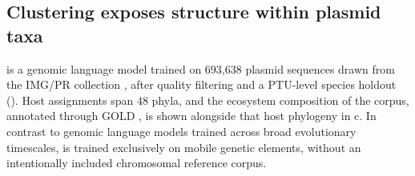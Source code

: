 %
%
%
%

\subsection*{Clustering exposes structure within plasmid taxa}
\label{sec:imgpr}

\model is a genomic language model trained on 693,638 plasmid sequences drawn
from the IMG/PR collection \cite{camargo2024img}, after quality filtering and
a PTU-level species holdout (). Host assignments span 48
phyla, and the ecosystem composition of the corpus, annotated through GOLD
\cite{mukherjee2023twenty}, is shown alongside that host phylogeny in
c. In contrast to genomic language models trained
across broad evolutionary timescales, \model is trained exclusively on mobile
genetic elements, without an intentionally included chromosomal reference
corpus.

